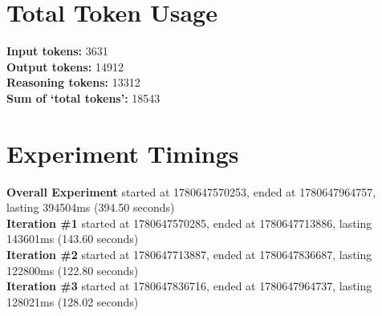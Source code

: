 \documentclass{article}
\begin{document}
\section*{Total Token Usage}
\textbf{Input tokens: }3631
\\\textbf{Output tokens: }14912
\\\textbf{Reasoning tokens: }13312
\\\textbf{Sum of `total tokens': }18543
\section*{Experiment Timings}
\textbf{Overall Experiment} started at 1780647570253, ended at 1780647964757, lasting 394504ms (394.50 seconds)
\\\textbf{Iteration \#1} started at 1780647570285, ended at 1780647713886, lasting 143601ms (143.60 seconds)
\\\textbf{Iteration \#2} started at 1780647713887, ended at 1780647836687, lasting 122800ms (122.80 seconds)
\\\textbf{Iteration \#3} started at 1780647836716, ended at 1780647964737, lasting 128021ms (128.02 seconds)
\end{document}
